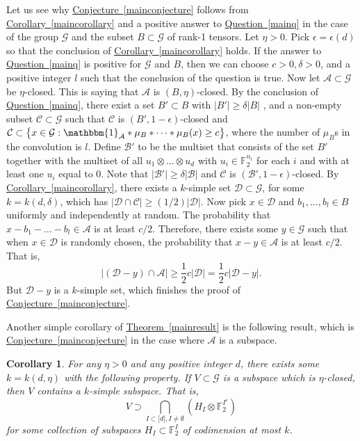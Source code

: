 \documentclass[11pt]{article}
\numberwithin{equation}{section}
\newtheorem{corollary}[theorem]{Corollary}
\theoremstyle{definition}
\theoremstyle{plain}
\newcommand{\expref}[2]{\hyperref[#2]{#1~\ref{#2}}}
\newcommand\eps{\epsilon}  %
\newcommand\F{\mathbb{F}}
\renewcommand\d{\delta}
\newcommand{\ind}{\mathbbm{1}}
\newcommand \cA{\mathcal A}
\newcommand \cB{\mathcal B}
\newcommand \cC{\mathcal C}
\newcommand \cD{\mathcal D}
\newcommand \cG{\mathcal G}
\newcommand \s{\subset}
\begin{document}
\noindent Let us see why \expref{Conjecture}{mainconjecture} follows from \expref{Corollary}{maincorollary} and a positive answer to \expref{Question}{mainq} in the case of the group $\cG$ and the subset $B\s\cG$ of rank-1 tensors. Let $\eta>0$. Pick $\eps=\eps(d)$ so that the conclusion of \expref{Corollary}{maincorollary} holds. If the answer to \expref{Question}{mainq} is positive for $\cG$ and $B$, then we can choose $c>0,\d>0$, and a positive integer $l$ such that the conclusion of the question is true. Now let $\cA\s \cG$ be $\eta$-closed. This is saying that $\cA$ is $(B,\eta)$-closed. By the conclusion of \expref{Question}{mainq}, there exist a set $B'\s B$ with $|B'|\geq \d|B|$ , and a non-empty subset $\cC\s \cG$ such that $\cC$ is $(B',1-\eps)$-closed and $\cC\subset \bigl\{x\in \cG: \ind_{\cA}*\mu_B*\dots*\mu_B(x)\geq c\bigr\}$, where the number of $\mu_B$s in the convolution is $l$. Define $\cB'$ to be the multiset that consists of the set $B'$ together with the multiset of all $u_1\otimes \dots \otimes u_d$ with $u_i\in \F_2^{n_i}$ for each $i$ and with at least one $u_i$ equal to $0$. Note that $|\cB'|\geq \d|\cB|$ and $\cC$ is $(\cB',1-\eps)$-closed. By \expref{Corollary}{maincorollary}, there exists a $k$-simple set $\cD\s \cG$, for some $k=k(d,\d)$, which has $|\cD\cap \cC|\geq ({1}/{2})|\cD|$. Now pick $x\in \cD$ and $b_1,\dots,b_l \in B$ uniformly and independently at random. The probability that $x-b_1-\dots-b_l\in \cA$ is at least $c/2$. Therefore, there exists some $y\in \cG$ such that when $x\in \cD$ is randomly chosen, the probability that $x-y\in \cA$ is at least $c/2$. That is,
\[
  |(\cD-y)\cap \cA|\geq \frac{1}{2}c|\cD|=\frac{1}{2}c|\cD-y|.
\]
But $\cD-y$ is a $k$-simple set, which finishes the proof of
\expref{Conjecture}{mainconjecture}.

Another simple corollary of \expref{Theorem}{mainresult} is the following result, which is \expref{Conjecture}{mainconjecture} in the case where $\cA$ is a subspace.

\begin{corollary} \label{spacecorollary}
  For any $\eta>0$ and any positive integer $d$, there exists some $k=k(d,\eta)$ with the following property. If $V\s \cG$ is a subspace which is $\eta$-closed, then $V$ contains a $k$-simple subspace. That is,
  \[
    V\supset \bigcap_{I\s \lbrack d\rbrack,I\neq \emptyset}(H_I\otimes \F_2^{I^c})
  \]
  for some collection of subspaces $H_I\s \F_2^{I}$ of codimension at
  most $k$.
\end{corollary}
\end{document}
